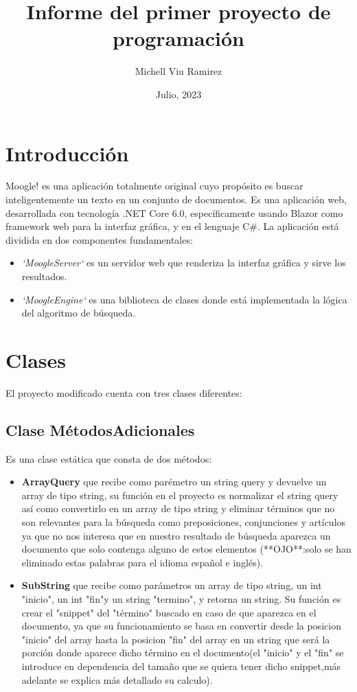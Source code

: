 \documentclass{article}
\begin{document}
\title{Informe del primer proyecto de programación}
\author{Michell Viu Ramirez}
\date{Julio, 2023}
\maketitle
\newpage
\tableofcontents
\newpage
\section{Introducción}
Moogle! es una aplicación totalmente original cuyo propósito es buscar inteligentemente un texto en un conjunto de documentos.
Es una aplicación web, desarrollada con tecnología .NET Core 6.0, específicamente usando Blazor como framework web para la interfaz gráfica, y en el lenguaje C\#. 
La aplicación está dividida en dos componentes fundamentales:
\begin{itemize}
    \item \textit{`MoogleServer`} es un servidor web que renderiza la interfaz gráfica y sirve los resultados.
    \item \textit{`MoogleEngine`} es una biblioteca de clases donde está implementada la lógica del algoritmo de búsqueda.
\end{itemize}
\section{Clases}
El proyecto modificado cuenta con tres clases diferentes:
\subsection{Clase MétodosAdicionales}
Es una clase estática que consta de dos métodos:
\begin{itemize}
    \item \textbf{ArrayQuery} que recibe como parémetro un string query y devuelve un array de tipo string, 
    su función en el proyecto es normalizar el string query así como convertirlo en un array de tipo string y 
    eliminar términos que no son relevantes para la búsqueda como preposiciones, conjunciones y artículos ya que 
    no nos interesa que en nuestro resultado de búsqueda aparezca un documento que solo contenga alguno de estos elementos 
    (**OJO**:solo se han eliminado estas palabras para el idioma español e inglés).
    \item \textbf{SubString}  que recibe como parámetros un array de tipo string, un int "inicio", un int "fin"y un string "termino",
     y retorna un string. Su función es crear el "snippet" del "término" buscado en caso de que aparezca en el documento, ya que su 
     funcionamiento se basa en convertir desde la posicion "inicio" del array hasta la posicion "fin" del array en un string que será 
     la porción donde aparece dicho término en el documento(el "inicio" y el "fin" se introduce en dependencia del tamaño que se quiera 
     tener dicho snippet,más adelante se explica más detallado su calculo).
\end{itemize}
\end{document}
